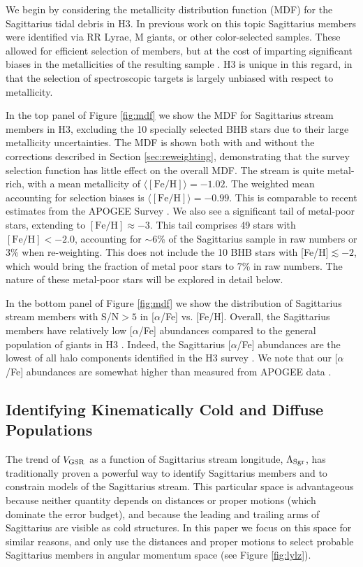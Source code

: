 \documentclass[twocolumn,tighten,twocolappendix]{aastex63}
\newcommand{\sgr}{Sagittarius}
\newcommand{\feh}{[\mathrm{Fe}/\mathrm{H}]}
\newcommand{\Vgsr}{V_{\rm GSR}}
\begin{document}
\begin{CJK*}{UTF8}{gbsn}
We begin by considering the metallicity distribution function (MDF) for the \sgr{} tidal debris in H3.  In previous work on this topic \sgr{} members were identified via RR Lyrae, M giants, or other color-selected samples.  These allowed for efficient selection of members, but at the cost of imparting significant biases in the metallicities of the resulting sample \citep[see][for a discussion of some of these issues]{Conroy19b}.  H3 is unique in this regard, in that the selection of spectroscopic targets is largely unbiased with respect to metallicity.

In the top panel of Figure \ref{fig:mdf} we show the MDF for \sgr{} stream members in H3, excluding the 10 specially selected BHB stars due to their large metallicity uncertainties.  The MDF is shown both with and without the corrections described in Section \ref{sec:reweighting}, demonstrating that the survey selection function has little effect on the overall MDF. The stream is quite metal-rich, with a mean metallicity of $\langle\feh\rangle=-1.02$. The weighted mean accounting for selection biases is $\langle\feh\rangle=-0.99$. This is comparable to recent estimates from the APOGEE Survey \citep{Hayes20}.  We also see a significant tail of metal-poor stars, extending to $\feh\approx-3$.  This tail comprises 49 stars with $\feh<-2.0$, accounting for $\sim 6$\% of the \sgr{} sample in raw numbers or 3\% when re-weighting. This does not include the 10 BHB stars with [Fe/H]$\lesssim -2$, which would bring the fraction of metal poor stars to 7\% in raw numbers. The nature of these metal-poor stars will be explored in detail below.

In the bottom panel of Figure \ref{fig:mdf} we show the distribution of \sgr{} stream members with S/N$>5$ in [$\alpha$/Fe] vs. [Fe/H].  Overall, the \sgr{} members have relatively low [$\alpha$/Fe] abundances compared to the general population of giants in H3 \citep{Conroy19b}. Indeed, the \sgr{} [$\alpha$/Fe] abundances are the lowest of all halo components identified in the H3 survey \citep{Naidu20}. We note that our [$\alpha$/Fe] abundances are somewhat higher than measured from APOGEE data \citep{Hasselquist19, Hayes20}.

\subsection{Identifying Kinematically Cold and Diffuse Populations}
\label{s:vel_fit}

The trend of $\Vgsr$ as a function of \sgr{} stream longitude, $\Lambda_{\rm Sgr}$, has traditionally proven a powerful way to identify \sgr{} members and to constrain models of the \sgr{} stream.  This particular space is advantageous because neither quantity depends on distances or proper motions (which dominate the error budget), and because the leading and trailing arms of \sgr{} are visible as cold structures.  In this paper we focus on this space for similar reasons, and only use the distances and proper motions to select probable \sgr{} members in angular momentum space (see Figure \ref{fig:lylz}).


\end{CJK*}
\end{document}

